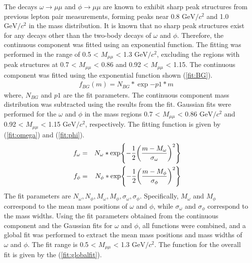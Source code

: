                 The decays \(\omega \rightarrow \mu\mu\) and \(\phi \rightarrow \mu\mu\) are known to exhibit sharp peak structures from previous lepton pair measurements, forming peaks near 0.8 \(\mathrm{GeV/}c^2\) and 1.0 \(\mathrm{GeV/}c^2\) in the mass distribution.
                It is known that no sharp peak structures exist for any decays other than the two-body decays of \(\omega\) and \(\phi\). Therefore, the continuous component was fitted using an exponential function. The fitting was performed in the range of 0.5 < \(M_{\mu\mu}\) < 1.3 \(\mathrm{GeV/}c^2\), excluding the regions with peak structures at 0.7 < \(M_{\mu\mu}\) < 0.86 and 0.92 < \(M_{\mu\mu}\) < 1.15. The continuous component was fitted using the exponential function shown (\ref{fit:BG}).
                \begin{eqnarray}
                    \label{fit:BG}
                    f_{BG}(m)=N_{BG}*\exp{-p1* m}
                \end{eqnarray}
                where, \(N_{BG}\) and \(p1\) are the fit parameters. The continuous component mass distribution was subtracted using the results from the fit. Gaussian fits were performed for the \(\omega\) and \(\phi\) in the mass regions 0.7 < \(M_{\mu\mu}\) < 0.86 \(\mathrm{GeV}/c^2\) and 0.92 < \(M_{\mu\mu}\) < 1.15 \(\mathrm{GeV}/c^2\), respectively. The fitting function is given by (\ref{fit:omega}) and (\ref{fit:phi}).
                \begin{eqnarray}
                    \label{fit:omega}
                    f_{\omega} &=& N_{\omega}*\exp{-\frac{1}{2}\qty(\frac{m-M_{\omega}}{\sigma_{\omega}})^2}\\\
                    \label{fit:phi}
                    f_{\phi} &=& N_{\phi}*\exp{-\frac{1}{2}\qty(\frac{m-M_{\phi}}{\sigma_{\phi}})^2}
                \end{eqnarray}
                The fit parameters are \(N_{\omega}, N_{\phi}, M_{\omega}, M_{\phi}, \sigma_{\omega}, \sigma_{\phi}\). Specifically, \(M_{\omega}\) and \(M_{\phi}\) correspond to the mean mass positions of \(\omega\) and \(\phi\), while \(\sigma_{\omega}\) and \(\sigma_{\phi}\) correspond to the mass widths. Using the fit parameters obtained from the continuous component and the Gaussian fits for \(\omega\) and \(\phi\), all functions were combined, and a global fit was performed to extract the mean mass positions and mass widths of \(\omega\) and \(\phi\). The fit range is 0.5 < \(M_{\mu\mu}\) < 1.3 \(\mathrm{GeV}/c^2\). The function for the overall fit is given by the (\ref{fit:globalfit}).
